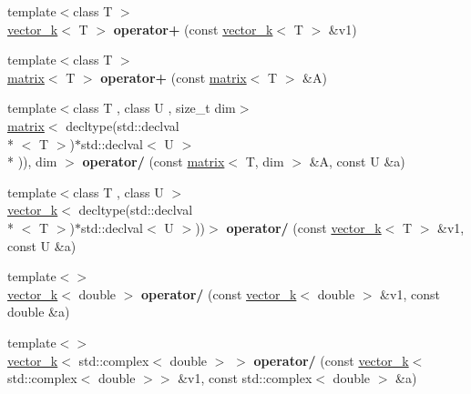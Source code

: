 \begin{DoxyCompactItemize}
\item 
\hypertarget{namespacekeycpp_a5daa1c95786fd3745687914963e7229e}{{\footnotesize template$<$class T $>$ }\\\hyperlink{classkeycpp_1_1vector__k}{vector\-\_\-k}$<$ T $>$ {\bfseries operator+} (const \hyperlink{classkeycpp_1_1vector__k}{vector\-\_\-k}$<$ T $>$ \&v1)}\label{namespacekeycpp_a5daa1c95786fd3745687914963e7229e}

\item 
\hypertarget{namespacekeycpp_a5b10f703c72875b9f5e2ecc5c7696f9c}{{\footnotesize template$<$class T $>$ }\\\hyperlink{classkeycpp_1_1matrix}{matrix}$<$ T $>$ {\bfseries operator+} (const \hyperlink{classkeycpp_1_1matrix}{matrix}$<$ T $>$ \&A)}\label{namespacekeycpp_a5b10f703c72875b9f5e2ecc5c7696f9c}

\item 
\hypertarget{namespacekeycpp_a4bb5672c8d698032875766c42cd52547}{{\footnotesize template$<$class T , class U , size\-\_\-t dim$>$ }\\\hyperlink{classkeycpp_1_1matrix}{matrix}$<$ decltype(std\-::declval\\*
$<$ T $>$)$\ast$std\-::declval$<$ U $>$\\*
)), dim $>$ {\bfseries operator/} (const \hyperlink{classkeycpp_1_1matrix}{matrix}$<$ T, dim $>$ \&A, const U \&a)}\label{namespacekeycpp_a4bb5672c8d698032875766c42cd52547}

\item 
\hypertarget{namespacekeycpp_afce3d5f6cf95bb68e12f3f80ff146ed8}{{\footnotesize template$<$class T , class U $>$ }\\\hyperlink{classkeycpp_1_1vector__k}{vector\-\_\-k}$<$ decltype(std\-::declval\\*
$<$ T $>$)$\ast$std\-::declval$<$ U $>$))$>$ {\bfseries operator/} (const \hyperlink{classkeycpp_1_1vector__k}{vector\-\_\-k}$<$ T $>$ \&v1, const U \&a)}\label{namespacekeycpp_afce3d5f6cf95bb68e12f3f80ff146ed8}

\item 
\hypertarget{namespacekeycpp_acf439f423c568a970ddc8cde5940a0e8}{{\footnotesize template$<$$>$ }\\\hyperlink{classkeycpp_1_1vector__k}{vector\-\_\-k}$<$ double $>$ {\bfseries operator/} (const \hyperlink{classkeycpp_1_1vector__k}{vector\-\_\-k}$<$ double $>$ \&v1, const double \&a)}\label{namespacekeycpp_acf439f423c568a970ddc8cde5940a0e8}

\item 
\hypertarget{namespacekeycpp_aef7e4ab9c187ffa93e45ec90e2d1d5d4}{{\footnotesize template$<$$>$ }\\\hyperlink{classkeycpp_1_1vector__k}{vector\-\_\-k}$<$ std\-::complex$<$ double $>$ $>$ {\bfseries operator/} (const \hyperlink{classkeycpp_1_1vector__k}{vector\-\_\-k}$<$ std\-::complex$<$ double $>$$>$ \&v1, const std\-::complex$<$ double $>$ \&a)}\label{namespacekeycpp_aef7e4ab9c187ffa93e45ec90e2d1d5d4}


\end{DoxyCompactItemize}
